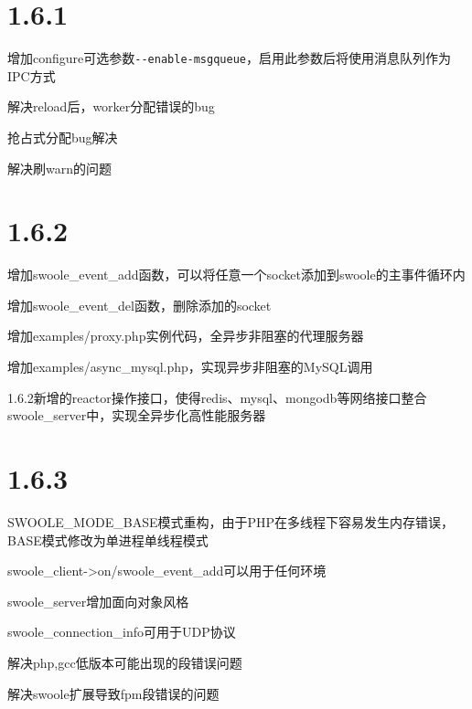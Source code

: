 \section{1.6.1}

\begin{compactitem}
\item 增加configure可选参数\texttt{-\/-enable-msgqueue}，启用此参数后将使用消息队列作为IPC方式
\item 解决reload后，worker分配错误的bug
\item 抢占式分配bug解决
\item 解决刷warn的问题
\end{compactitem}


\section{1.6.2}


\begin{compactitem}
\item 增加swoole\_event\_add函数，可以将任意一个socket添加到swoole的主事件循环内
\item 增加swoole\_event\_del函数，删除添加的socket
\item 增加examples/proxy.php实例代码，全异步非阻塞的代理服务器
\item 增加examples/async\_mysql.php，实现异步非阻塞的MySQL调用
\end{compactitem}

1.6.2新增的reactor操作接口，使得redis、mysql、mongodb等网络接口整合swoole\_server中，实现全异步化高性能服务器


\section{1.6.3}

\begin{compactitem}
\item SWOOLE\_MODE\_BASE模式重构，由于PHP在多线程下容易发生内存错误，BASE模式修改为单进程单线程模式
\item swoole\_client->on/swoole\_event\_add可以用于任何环境
\item swoole\_server增加面向对象风格
\item swoole\_connection\_info可用于UDP协议
\item 解决php,gcc低版本可能出现的段错误问题
\item 解决swoole扩展导致fpm段错误的问题
\end{compactitem}


